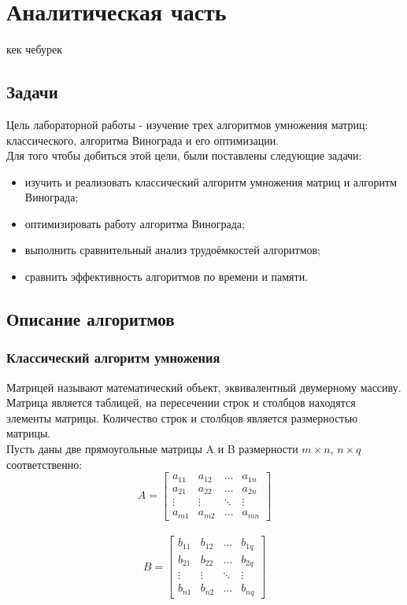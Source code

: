 \documentclass[12pt, a4paper]{report}
\begin{document}
    \chapter{Аналитическая часть}
    кек чебурек
	\section{Задачи}
	Цель лабораторной работы - изучение трех алгоритмов умножения матриц: классического, алгоритма Винограда и его оптимизации.\\
	Для того чтобы добиться этой цели, были поставлены следующие задачи:
	\begin{itemize}
		\item изучить и реализовать классический алгоритм умножения матриц и алгоритм Винограда;
		\item оптимизировать работу алгоритма Винограда;
		\item выполнить сравнительный анализ трудоёмкостей алгоритмов;
		\item сравнить эффективность алгоритмов по времени и памяти.
	\end{itemize}

	\section{Описание алгоритмов}
	
	\subsection{Классический алгоритм умножения}
	Матрицей называют математический объект, эквивалентный двумерному массиву. Матрица является таблицей, на пересечении строк и столбцов находятся элементы матрицы. Количество строк и столбцов является размерностью матрицы.\\
	Пусть даны две прямоугольные матрицы A и B размерности $m \times n$, $n \times q$
	соответственно:\\
	$$A =  \begin{bmatrix} 
	a_{11}& a_{12} &\ldots & a_{1n}\\ 
	a_{21}& a_{22} &\ldots & a_{2n}\\ 
	\vdots& \vdots &\ddots & \vdots\\ 
	a_{m1}& a_{m2} &\ldots & a_{mn} 
	\end{bmatrix} $$\\	
	
	$$B = \begin{bmatrix} 
	b_{11}& b_{12} &\ldots & b_{1q}\\ 
	b_{21}& b_{22} &\ldots & b_{2q}\\ 
	\vdots& \vdots &\ddots & \vdots\\ 
	b_{n1}& b_{n2} &\ldots & b_{nq} 
	\end{bmatrix} $$\\
	
\end{document}
